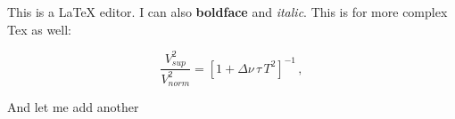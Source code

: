 This is a LaTeX editor. I can also \textbf{boldface} and \textit{italic}. This is for more complex Tex as well:

\begin{equation}
\frac{V_{ sup}^2}{V_{ norm}^2} = [1 + \Delta \nu \, \tau \, T^2 ]^{-1} \, ,
\end{equation}

And let me add another 